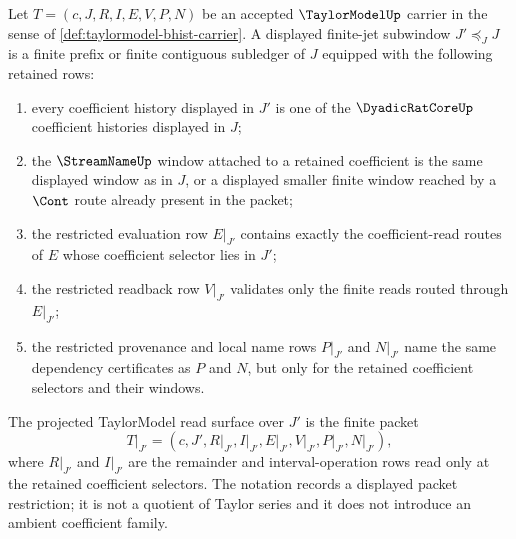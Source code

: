 \begin{definition}
\label{def:taylormodel-displayed-finite-jet-subwindow}
Let $T=(c,J,R,I,E,V,P,N)$ be an accepted $\TaylorModelUp$ carrier in the sense of \autoref{def:taylormodel-bhist-carrier}. A displayed finite-jet subwindow $J'\preceq_J J$ is a finite prefix or finite contiguous subledger of $J$ equipped with the following retained rows:
\begin{enumerate}
\item every coefficient history displayed in $J'$ is one of the $\DyadicRatCoreUp$ coefficient histories displayed in $J$;
\item the $\StreamNameUp$ window attached to a retained coefficient is the same displayed window as in $J$, or a displayed smaller finite window reached by a $\Cont$ route already present in the packet;
\item the restricted evaluation row $E\vert_{J'}$ contains exactly the coefficient-read routes of $E$ whose coefficient selector lies in $J'$;
\item the restricted readback row $V\vert_{J'}$ validates only the finite reads routed through $E\vert_{J'}$;
\item the restricted provenance and local name rows $P\vert_{J'}$ and $N\vert_{J'}$ name the same dependency certificates as $P$ and $N$, but only for the retained coefficient selectors and their windows.
\end{enumerate}
The projected TaylorModel read surface over $J'$ is the finite packet
$$
T\vert_{J'}=(c,J',R\vert_{J'},I\vert_{J'},E\vert_{J'},V\vert_{J'},P\vert_{J'},N\vert_{J'}),
$$
where $R\vert_{J'}$ and $I\vert_{J'}$ are the remainder and interval-operation rows read only at the retained coefficient selectors. The notation records a displayed packet restriction; it is not a quotient of Taylor series and it does not introduce an ambient coefficient family.
\end{definition}

